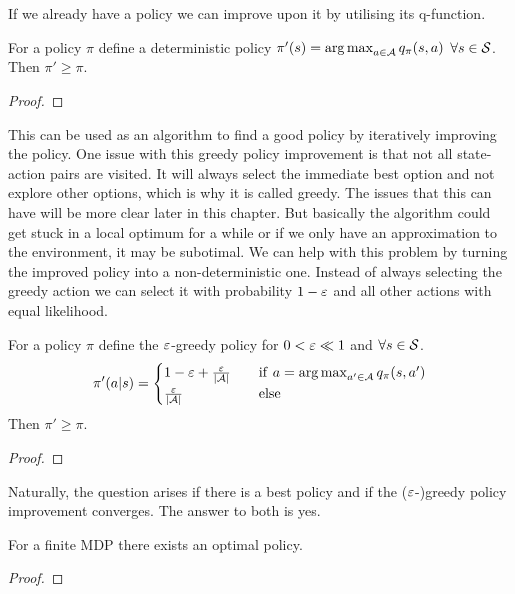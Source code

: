 If we already have a policy we can improve upon it by utilising its q-function. 

\begin{proposition}
    For a policy $\pi$ define a deterministic policy $\pi'(s) = \argmax_{a \in \A} q_\pi(s, a)$ $\forall s \in \S$. Then $\pi' \ge \pi$.
\end{proposition}
\begin{proof}
    \todo
\end{proof}

This can be used as an algorithm to find a good policy by iteratively improving the policy. One issue with this greedy policy improvement is that not all state-action pairs are visited. It will always select the immediate best option and not explore other options, which is why it is called greedy. The issues that this can have will be more clear later in this chapter. But basically the algorithm could get stuck in a local optimum for a while or if we only have an approximation to the environment, it may be subotimal. We can help with this problem by turning the improved policy into a non-deterministic one. Instead of always selecting the greedy action we can select it with probability $1 - \eps$ and all other actions with equal likelihood.

\begin{proposition}
    For a policy $\pi$ define the $\eps$-greedy policy for $0 < \eps \ll 1$ and $\forall s \in \S$.
    $$\pi'(a | s) = \begin{cases}
            1 - \eps + \frac{\eps}{|\A|} \quad & \mathrm{if} \ a = \argmax_{a' \in \A} q_\pi(s, a') \\
            \frac{\eps}{|\A|} \quad            & \mathrm{else}
        \end{cases}$$
    Then $\pi' \ge \pi$.
\end{proposition}
\begin{proof}
\end{proof}

Naturally, the question arises if there is a best policy and if the ($\eps$-)greedy policy improvement converges. The answer to both is yes.

\begin{proposition}
    \label{prop:optimal-policy}
    For a finite MDP there exists an optimal policy.
\end{proposition}
\begin{proof}
    \todo
\end{proof}

